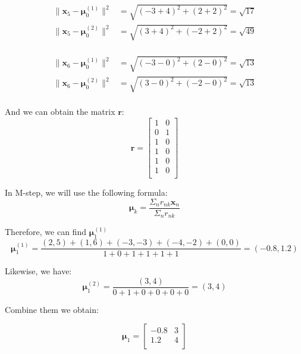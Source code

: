 \begin{solution}
    \[
        \begin{align*}
            \lVert \bm{x}_5 - \bm{\mu}^{(1)}_0 \rVert^2 &= \sqrt{(-3 + 4)^2 + (2 + 2)^2} = \sqrt{17} \\
            \lVert \bm{x}_5 - \bm{\mu}^{(2)}_0 \rVert^2 &= \sqrt{(3 + 4)^2 + (-2 + 2)^2} = \sqrt{49} \\
        \end{align*}
    \]

    \[
        \begin{align*}
            \lVert \bm{x}_6 - \bm{\mu}^{(1)}_0 \rVert^2 &= \sqrt{(-3 - 0)^2 + (2 - 0)^2} = \sqrt{13} \\
            \lVert \bm{x}_6 - \bm{\mu}^{(2)}_0 \rVert^2 &= \sqrt{(3 - 0)^2 + (-2 - 0)^2} = \sqrt{13} \\
        \end{align*}
    \]

    And we can obtain the matrix $\bm{r}$:
    \[
        \bm{r} =
        \begin{bmatrix}
            1 & 0 \\
            0 & 1 \\
            1 & 0 \\
            1 & 0 \\
            1 & 0 \\
            1 & 0 \\
        \end{bmatrix}
    \]

     In M-step, we will use the following formula:
    \[
        \bm{\mu}_k = \frac{\Sigma_n r_{nk} \bm{x}_n}{\Sigma_n r_{nk}}
    \]

    Therefore, we can find $\bm{\mu}^{(1)}_1$
    \[
        \bm{\mu}^{(1)}_1
        = \frac{(2, 5) + (1, 6) + (-3, -3) + (-4, -2) + (0, 0)}{1 + 0 + 1 + 1 + 1 + 1}
        = \left( -0.8, 1.2 \right)
    \]

    Likewise, we have:
    \[
        \bm{\mu}^{(2)}_1
        = \frac{(3, 4)}{0 + 1 + 0 + 0 + 0 + 0}
        = (3, 4)
    \]

    Combine them we obtain:

    \[
        \bm{\mu}_1 =
        \begin{bmatrix}
            -0.8 & 3 \\
            1.2  & 4 \\
        \end{bmatrix}
    \]
\end{solution}